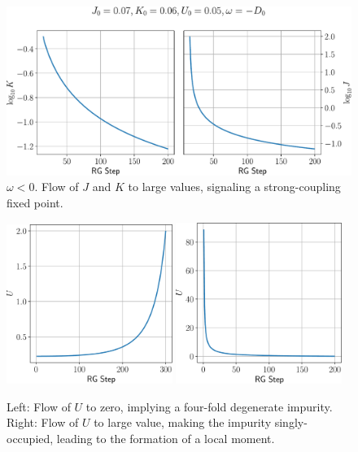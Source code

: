 \documentclass[12pt,twoside]{report}
\numberwithin{equation}{section}
\begin{document}
\begin{figure}[htpb!]
	\centering
	\includegraphics[width=\textwidth]{../figures/low_w_JK.pdf}
	\caption{\(\omega < 0\). Flow of \(J\) and \(K\) to large values, signaling a strong-coupling fixed point.}
	\label{J_sc}
\end{figure}
\begin{figure}[htpb]
	\centering
	\includegraphics[width=0.48\textwidth]{../figures/U_irr.pdf}
	\includegraphics[width=0.48\textwidth]{../figures/U_rel.pdf}
	\caption{Left: Flow of \(U\) to zero, implying a four-fold degenerate impurity. Right: Flow of \(U\) to large value, making the impurity singly-occupied, leading to the formation of a local moment.}
	\label{U_flow}
\end{figure}
\end{document}
